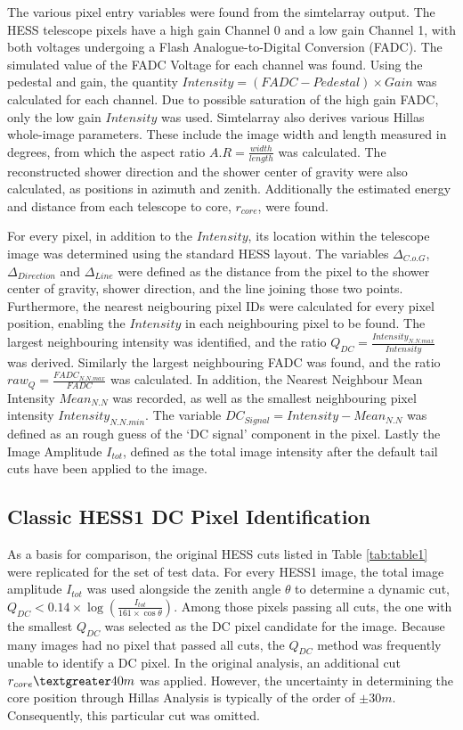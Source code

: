 \documentclass{article}
\begin{document}
The various pixel entry variables were found from the sim\textunderscore telarray output. The HESS telescope pixels have a high gain Channel 0 and a low gain Channel 1, with both voltages undergoing a Flash Analogue-to-Digital Conversion (FADC). The simulated value of the FADC Voltage for each channel was found. Using the pedestal and gain, the quantity $Intensity = (FADC - Pedestal)\times Gain $ was calculated for each channel. Due to possible saturation of the high gain FADC, only the low gain $Intensity$ was used. Sim\textunderscore telarray also derives various Hillas whole-image parameters. These include the image width and length measured in degrees, from which the aspect ratio $A.R = \frac{width}{length}$ was calculated. The reconstructed shower direction and the shower center of gravity were also calculated, as positions in azimuth and zenith. Additionally the estimated energy and distance from each telescope to core, $r_{core}$,  were found.

For every pixel, in addition to the $Intensity$, its location within the telescope image was determined using the standard HESS layout. The variables $ \Delta_{C.o.G}$, $\Delta_{Direction}$ and $\Delta_{Line}$ were defined as the distance from the pixel to the shower center of gravity, shower direction, and the line joining those two points. Furthermore, the nearest neigbouring pixel IDs were calculated for every pixel position, enabling the $Intensity$ in each neighbouring pixel to be found. The largest neighbouring intensity was identified, and the ratio $Q_{DC} = \frac{Intensity_{N.N.max}}{Intensity}$ was derived. Similarly the largest neighbouring FADC was found, and the ratio $raw_{Q} = \frac{FADC_{N.N.max}}{FADC}$ was calculated. In addition, the Nearest Neighbour Mean Intensity $Mean_{N.N}$ was recorded, as well as the smallest neighbouring pixel intensity $Intensity_{N.N.min}$. The variable $DC_{Signal} = Intensity-Mean_{N.N}$ was defined as an rough guess of the \textquoteleft DC signal' component in the pixel. Lastly the Image Amplitude $I_{tot}$, defined as the total image intensity after the default tail cuts have been applied to the image.

\subsection{Classic HESS1 DC Pixel Identification}
As a basis for comparison, the original HESS cuts listed in Table \ref{tab:table1} were replicated for the set of test data. For every HESS1 image, the total image amplitude $I_{tot}$ was used alongside the zenith angle $\theta$ to determine a dynamic cut, $Q_{DC} < 0.14 \times \log(\frac{I_{tot}}{161 \times \cos \theta})$. Among those pixels passing all cuts, the one with the smallest $Q_{DC}$ was selected as the DC pixel candidate for the image. Because many images had no pixel that passed all cuts, the $Q_{DC}$ method was frequently unable to identify a DC pixel. In the original analysis, an additional cut $r_{core} \textgreater 40m$ was applied. However, the uncertainty in determining the core position through Hillas Analysis is typically of the order of $\pm 30m$. Consequently, this particular cut was omitted.
\end{document}
